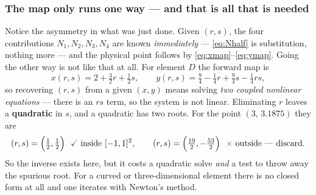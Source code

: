 \documentclass[11pt]{article}
\newcommand{\cmark}{{\color{green!55!black}\checkmark}}
\newcommand{\xmark}{{\color{red!65!black}$\times$}}
\begin{document}
\medskip
\noindent{}

\subsubsection*{The map only runs one way --- and that is all that is needed}

Notice the asymmetry in what was just done. Given $(r,s)$, the four
contributions $N_{1},N_{2},N_{3},N_{4}$ are known \emph{immediately} ---
\eqref{eq:Nhalf} is substitution, nothing more --- and the physical point
follows by \eqref{eq:xmap}--\eqref{eq:ymap}. Going the other way is not like
that at all. For element $D$ the forward map is
\begin{equation}\label{eq:fwdD}
  x(r,s)=2+\tfrac32 r+\tfrac12 s,
  \qquad
  y(r,s)=\tfrac94-\tfrac14 r+\tfrac94 s-\tfrac14 rs ,
\end{equation}
so recovering $(r,s)$ from a given $(x,y)$ means solving \emph{two coupled
nonlinear equations} --- there is an $rs$ term, so the system is not linear.
Eliminating $r$ leaves a \textbf{quadratic} in $s$, and a quadratic has two
roots. For the point $(3,\,3.1875)$ they are
\begin{equation}\label{eq:invD}
  (r,s)=\Bigl(\tfrac12,\tfrac12\Bigr)\ \ \text{\cmark\ inside } [-1,1]^{2},
  \qquad
  (r,s)=\Bigl(\tfrac{19}{2},-\tfrac{53}{2}\Bigr)\ \ \text{\xmark\ outside --- discard} .
\end{equation}
So the inverse exists here, but it costs a quadratic solve \emph{and} a test to
throw away the spurious root. For a curved or three-dimensional element there
is no closed form at all and one iterates with Newton's method.

\medskip
\noindent{}
\end{document}
